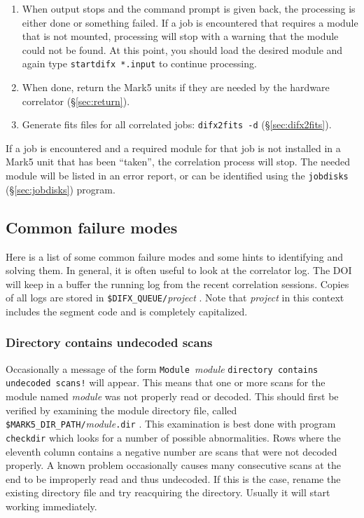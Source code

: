 \begin{enumerate}
\item When output stops and the command prompt is given back, the processing is either done or something failed.
If a job is encountered that requires a module that is not mounted, processing will stop with a warning that the module could not be found.
At this point, you should load the desired module and again type {\tt startdifx *.input} to continue processing. 
\item When done, return the Mark5 units if they are needed by the hardware correlator (\S\ref{sec:return}). \label{item:done}
\item Generate fits files for all correlated jobs: {\tt difx2fits -d} (\S\ref{sec:difx2fits}). \label{item:end}
\end{enumerate}

If a job is encountered and a required module for that job is not installed in a Mark5 unit that has been ``taken'', the correlation process will stop.
The needed module will be listed in an error report, or can be identified using the {\tt jobdisks} (\S\ref{sec:jobdisks}) program.


\subsection{Common failure modes}

Here is a list of some common failure modes and some hints to identifying and solving them.
In general, it is often useful to look at the correlator log.
The DOI will keep in a buffer the running log from the recent correlation sessions.
Copies of all logs are stored in {\tt \$DIFX\_QUEUE/}{\em project} .
Note that {\em project} in this context includes the segment code and is completely capitalized.

\subsubsection{Directory contains undecoded scans}

Occasionally a message of the form {\tt Module }{\em module} {\tt directory contains undecoded scans!} will appear.
This means that one or more scans for the module named {\em module} was not properly read or decoded.
This should first be verified by examining the module directory file, called {\tt \$MARK5\_DIR\_PATH/}{\em module}{\tt .dir} .
This examination is best done with program {\tt checkdir} which looks for a number of possible abnormalities.
Rows where the eleventh column contains a negative number are scans that were not decoded properly.
A known problem occasionally causes many consecutive scans at the end to be improperly read and thus undecoded.  
If this is the case, rename the existing directory file and try reacquiring the directory.
Usually it will start working immediately.

